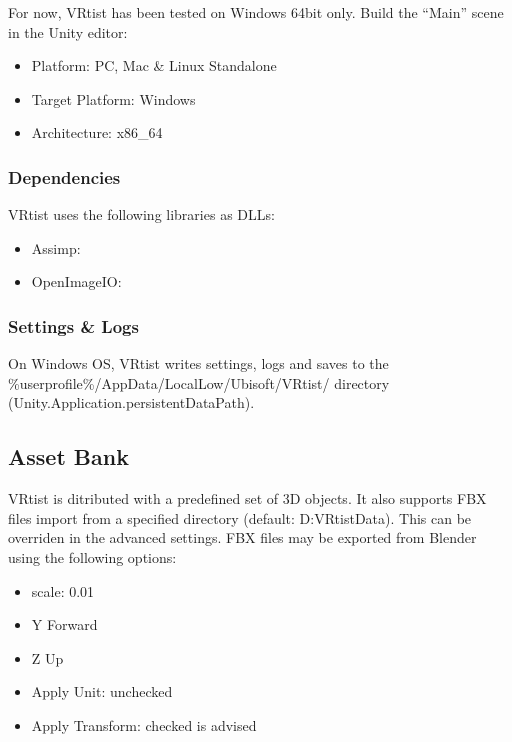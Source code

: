 \documentclass[letterpaper,10pt,english,openany,oneside]{sphinxmanual}
\begin{document}
\sphinxAtStartPar
For now, VRtist has been tested on Windows 64bit only. Build the “Main” scene in the Unity editor:
\begin{itemize}
\item {} 
\sphinxAtStartPar
Platform: PC, Mac \& Linux Standalone

\item {} 
\sphinxAtStartPar
Target Platform: Windows

\item {} 
\sphinxAtStartPar
Architecture: x86\_64

\end{itemize}


\subsubsection{Dependencies}
\label{\detokenize{Start/GettingStarted:dependencies}}
\sphinxAtStartPar
VRtist uses the following libraries as DLLs:
\begin{itemize}
\item {} 
\sphinxAtStartPar
Assimp: 

\item {} 
\sphinxAtStartPar
OpenImageIO: 

\end{itemize}


\subsubsection{Settings \& Logs}
\label{\detokenize{Start/GettingStarted:settings-logs}}
\sphinxAtStartPar
On Windows OS, VRtist writes settings, logs and saves to the \%userprofile\%/AppData/LocalLow/Ubisoft/VRtist/ directory (Unity.Application.persistentDataPath).


\subsection{Asset Bank}
\label{\detokenize{Start/GettingStarted:asset-bank}}
\sphinxAtStartPar
VRtist is ditributed with a predefined set of 3D objects. It also supports FBX files import from a specified directory (default: D:VRtistData). This can be overriden in the advanced settings. FBX files may be exported from Blender using the following options:
\begin{itemize}
\item {} 
\sphinxAtStartPar
scale: 0.01

\item {} 
\sphinxAtStartPar
Y Forward

\item {} 
\sphinxAtStartPar
Z Up

\item {} 
\sphinxAtStartPar
Apply Unit: unchecked

\item {} 
\sphinxAtStartPar
Apply Transform: checked is advised

\end{itemize}
\end{document}
